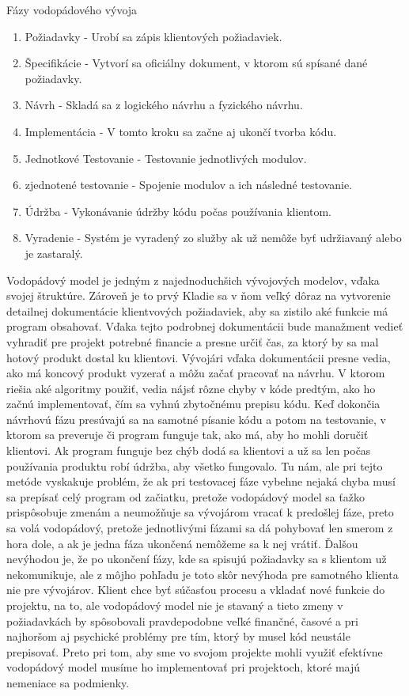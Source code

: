 \documentclass[10pt,oneside,slovak,a4paper]{article}
\begin{document}
Fázy vodopádového vývoja
\begin{enumerate}
\item Požiadavky - Urobí sa zápis  klientových požiadaviek.
\item Špecifikácie - Vytvorí sa oficiálny dokument, v ktorom sú spísané dané požiadavky.
\item Návrh -  Skladá sa z logického návrhu a fyzického návrhu.
\item Implementácia - V tomto kroku sa začne aj ukončí tvorba kódu.
\item Jednotkové Testovanie - Testovanie jednotlivých modulov.
\item zjednotené testovanie - Spojenie modulov a ich následné testovanie.
\item Údržba - Vykonávanie údržby kódu počas používania klientom.
\item Vyradenie - Systém je vyradený zo služby ak už nemôže byť udržiavaný alebo je zastaralý.\cite{Sherrell2013}
\end{enumerate}

Vodopádový model je jedným z najednoduchšich vývojových modelov, vďaka svojej štruktúre. Zároveň je to prvý Kladie sa v ňom veľký dôraz na vytvorenie detailnej dokumentácie klientvových požiadaviek, aby sa zistilo aké funkcie má program obsahovať. Vďaka tejto podrobnej dokumentácii bude manažment vedieť vyhradiť pre projekt potrebné financie a presne určiť čas, za ktorý by sa mal hotový produkt dostal ku klientovi. Vývojári vďaka dokumentácii presne vedia, ako má koncový produkt vyzerať a môžu začať pracovať na návrhu. V ktorom riešia aké algoritmy použiť, vedia nájsť rôzne chyby v kóde predtým, ako ho začnú implementovať, čím sa vyhnú zbytočnému prepisu kódu. Keď dokončia návrhovú fázu presúvajú sa na samotné písanie kódu a potom na testovanie, v ktorom sa preveruje či program funguje tak, ako má, aby ho mohli doručiť klientovi. Ak program funguje bez chýb dodá sa klientovi a už sa len počas používania produktu robí údržba, aby všetko fungovalo. Tu nám, ale pri tejto metóde vyskakuje problém, že ak pri testovacej fáze vybehne nejaká chyba musí sa prepísať celý program od začiatku, pretože vodopádový model sa ťažko prispôsobuje zmenám a neumožňuje sa vývojárom vracať k predošlej fáze, preto sa volá vodopádový, pretože jednotlivými fázami sa dá pohybovať len smerom z hora dole, a ak je jedna fáza ukončená nemôžeme sa k nej vrátiť. Ďalšou nevýhodou je, že po ukončení fázy, kde sa spisujú požiadavky sa s klientom už nekomunikuje, ale z môjho pohľadu je toto skôr nevýhoda pre samotného klienta nie pre vývojárov. Klient chce byť súčasťou procesu a vkladať nové funkcie do projektu, na to, ale vodopádový model nie je stavaný a tieto zmeny v požiadavkách by spôsobovali pravdepodobne veľké finančné, časové a pri najhoršom aj psychické problémy pre tím, ktorý by musel kód neustále prepisovať. Preto pri tom, aby sme vo svojom projekte mohli využiť efektívne vodopádový model musíme ho implementovať pri projektoch, ktoré majú nemeniace sa podmienky.
\end{document}
